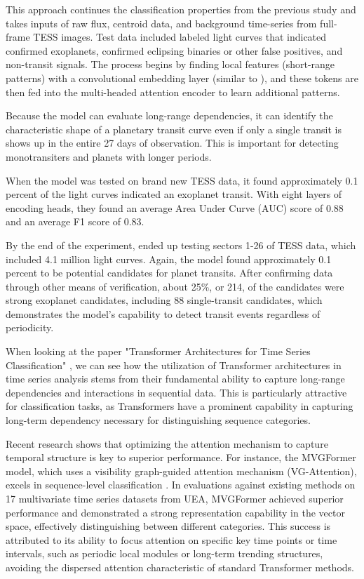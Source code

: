 \documentclass[letterpaper]{article} %
\begin{document}
This approach continues the classification properties from the previous study \cite{salinas2023distinguishingtransitfalsepositives} and takes inputs of raw flux, centroid data, and background time-series from full-frame TESS images. Test data included labeled light curves that indicated confirmed exoplanets, confirmed eclipsing binaries or other false positives, and non-transit signals. The process begins by finding local features (short-range patterns) with a convolutional embedding layer (similar to \cite{salinas2023distinguishingtransitfalsepositives}), and these tokens are then fed into the multi-headed attention encoder to learn additional patterns.

Because the model can evaluate long-range dependencies, it can identify the characteristic shape of a planetary transit curve even if only a single transit is shows up in the entire 27 days of observation. This is important for detecting monotransiters and planets with longer periods.

When the model was tested on brand new TESS data, it found approximately 0.1 percent of the light curves indicated an exoplanet transit. With eight layers of encoding heads, they found an average Area Under Curve (AUC) score of 0.88 and an average F1 score of 0.83.

By the end of the experiment, \citeauthor{salinas2025tessfullframe} ended up testing sectors 1-26 of TESS data, which included 4.1 million light curves. Again, the model found approximately 0.1 percent to be potential candidates for planet transits. After confirming data through other means of verification, about 25\%, or 214, of the candidates were strong exoplanet candidates, including 88 single-transit candidates, which demonstrates the model's capability to detect transit events regardless of periodicity.

When looking at the paper "Transformer Architectures for Time Series Classification" \cite{wen2023transformerstimeseriessurvey}, we can see how the utilization of Transformer architectures in time series analysis stems from their fundamental ability to capture long-range dependencies and interactions in sequential data. This is particularly attractive for classification tasks, as Transformers have a prominent capability in capturing long-term dependency necessary for distinguishing sequence categories.

Recent research shows that optimizing the attention mechanism to capture temporal structure is key to superior performance. For instance, the MVGFormer model, which uses a visibility graph-guided attention mechanism (VG-Attention), excels in sequence-level classification \cite{chen2025graphbased}. In evaluations against existing methods on 17 multivariate time series datasets from UEA, MVGFormer achieved superior performance and demonstrated a strong representation capability in the vector space, effectively distinguishing between different categories. This success is attributed to its ability to focus attention on specific key time points or time intervals, such as periodic local modules or long-term trending structures, avoiding the dispersed attention characteristic of standard Transformer methods.
\end{document}

